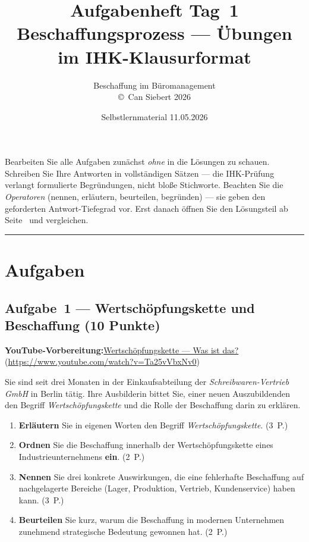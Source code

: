 \documentclass[11pt, a4paper]{article}
\title{\vspace*{-1.5cm}\Huge\bfseries\color{bfwPrimaryDark}Aufgabenheft Tag~1\\[0.4em]
  \large\color{bfwInkSoft}\textnormal{Beschaffungsprozess --- Übungen im IHK-Klausurformat}}
\author{\textsf{Beschaffung im Büromanagement}\\
\textsf{\small\copyright\ Can Siebert\,\textperiodcentered\,2026}}
\date{Selbstlernmaterial \textperiodcentered{} 11.05.2026}
\begin{document}
\maketitle
\thispagestyle{empty}

\begin{merksatz}[title={\bfseries So nutzen Sie dieses Aufgabenheft}]
Bearbeiten Sie alle Aufgaben zunächst \emph{ohne} in die Lösungen zu schauen. Schreiben
Sie Ihre Antworten in vollständigen Sätzen --- die IHK-Prüfung verlangt formulierte
Begründungen, nicht bloße Stichworte. Beachten Sie die \emph{Operatoren} (nennen,
erläutern, beurteilen, begründen) --- sie geben den geforderten Antwort-Tiefegrad vor.
Erst danach öffnen Sie den Lösungsteil ab Seite~\pageref{loesungen} und vergleichen.
\end{merksatz}

\tableofcontents
\vspace{1em}
\hrule

\section{Aufgaben}

\subsection*{Aufgabe~1 --- Wertschöpfungskette und Beschaffung (10 Punkte)}

\noindent\textbf{\color{bfwAccent}YouTube-Vorbereitung:}\enspace \href{https://www.youtube.com/watch?v=Ta25vVbxNv0}{Wertschöpfungskette --- Was ist das?} (\url{https://www.youtube.com/watch?v=Ta25vVbxNv0})

\medskip
Sie sind seit drei Monaten in der Einkaufsabteilung der \emph{Schreibwaren-Vertrieb GmbH}
in Berlin tätig. Ihre Ausbilderin bittet Sie, einer neuen Auszubildenden den Begriff
\emph{Wertschöpfungskette} und die Rolle der Beschaffung darin zu erklären.

\begin{enumerate}[label=(\alph*)]
  \item \textbf{Erläutern} Sie in eigenen Worten den Begriff \emph{Wertschöpfungskette}. \hfill (3~P.)
  \item \textbf{Ordnen} Sie die Beschaffung innerhalb der Wertschöpfungskette eines Industrieunternehmens \textbf{ein}. \hfill (2~P.)
  \item \textbf{Nennen} Sie drei konkrete Auswirkungen, die eine fehlerhafte Beschaffung auf nachgelagerte Bereiche (Lager, Produktion, Vertrieb, Kundenservice) haben kann. \hfill (3~P.)
  \item \textbf{Beurteilen} Sie kurz, warum die Beschaffung in modernen Unternehmen zunehmend strategische Bedeutung gewonnen hat. \hfill (2~P.)
\end{enumerate}
\end{document}
